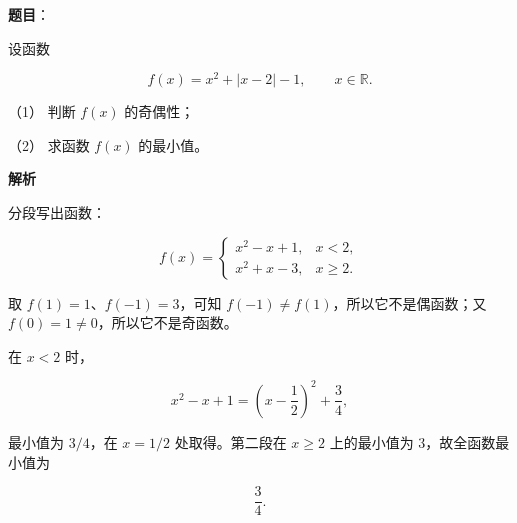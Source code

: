 \begin{answer}

\textbf{题目}：

设函数

\nopagebreak[4]
\[
f(x)=x^2+|x-2|-1,\qquad x\in\mathbb R.
\]

（1） 判断 $f(x)$ 的奇偶性；

（2） 求函数 $f(x)$ 的最小值。

\textbf{解析}

分段写出函数：

\nopagebreak[4]
\[
f(x)=
\begin{cases}
x^2-x+1,&x<2,\\
x^2+x-3,&x\geqslant2.
\end{cases}
\]


取 $f(1)=1$、$f(-1)=3$，可知 $f(-1)\neq f(1)$，所以它不是偶函数；又 $f(0)=1\neq0$，所以它不是奇函数。


在 $x<2$ 时，

\nopagebreak[4]
\[
x^2-x+1=\left(x-\frac12\right)^2+\frac34,
\]

最小值为 $3/4$，在 $x=1/2$ 处取得。第二段在 $x\geqslant2$ 上的最小值为 $3$，故全函数最小值为

\nopagebreak[4]
\[
\frac34.
\]



\end{answer}
